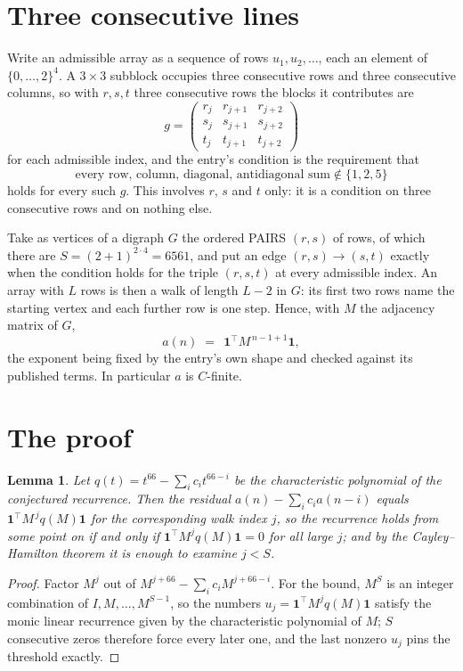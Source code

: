 \documentclass[11pt,a4paper]{article}
\theoremstyle{plain}
\newtheorem{lemma}[theorem]{Lemma}
\theoremstyle{definition}
\begin{document}
\section{Three consecutive lines}

Write an admissible array as a sequence of rows $u_1,u_2,\dots$, each an element of
$\{0,\dots,2\}^{4}$. A $3\times3$ subblock occupies three consecutive rows and
three consecutive columns, so with $r,s,t$ three consecutive rows the blocks it
contributes are
\[
g=\begin{pmatrix}r_j&r_{j+1}&r_{j+2}\\ s_j&s_{j+1}&s_{j+2}\\ t_j&t_{j+1}&t_{j+2}\end{pmatrix}
\]
for each admissible index, and the entry's condition is the requirement that
\[
\text{every row, column, diagonal, antidiagonal sum} \notin \{1,2,5\}
\]
holds for every such $g$. This involves $r$, $s$ and $t$ only: it is a condition on
three consecutive rows and on nothing else.

Take as vertices of a digraph $G$ the ordered PAIRS $(r,s)$ of rows, of which there are
$S=(2+1)^{2\cdot4}=6561$, and put an edge $(r,s)\to(s,t)$ exactly when the condition
holds for the triple $(r,s,t)$ at every admissible index. An array with $L$ rows is then a
walk of length $L-2$ in $G$: its first two rows name the starting vertex and each further
row is one step. Hence, with $M$ the adjacency matrix of $G$,
\[
a(n)\;=\;\,\mathbf{1}^{\!\top}M^{\,n-1+1}\mathbf{1},
\]
the exponent being fixed by the entry's own shape and checked against its published terms.
In particular $a$ is $C$-finite.

\section{The proof}

\begin{lemma}\label{lem:crit}
Let $q(t)=t^{66}-\sum_i c_it^{66-i}$ be the characteristic polynomial of the
conjectured recurrence. Then the residual $a(n)-\sum_ic_ia(n-i)$ equals
$\mathbf{1}^{\!\top}M^{\,j}q(M)\mathbf{1}$ for the corresponding walk index
$j$, so the recurrence holds from some point on if and only if
$\mathbf{1}^{\!\top}M^{j}q(M)\mathbf{1}=0$ for all large $j$; and by the
Cayley--Hamilton theorem it is enough to examine $j<S$.
\end{lemma}

\begin{proof}
Factor $M^{j}$ out of $M^{j+66}-\sum_ic_iM^{j+66-i}$. For the bound, $M^{S}$
is an integer combination of $I,M,\dots,M^{S-1}$, so the numbers
$u_j=\mathbf{1}^{\!\top}M^{j}q(M)\mathbf{1}$ satisfy the monic linear recurrence given by
the characteristic polynomial of $M$; $S$ consecutive zeros therefore force every later one,
and the last nonzero $u_j$ pins the threshold exactly.
\end{proof}
\end{document}
